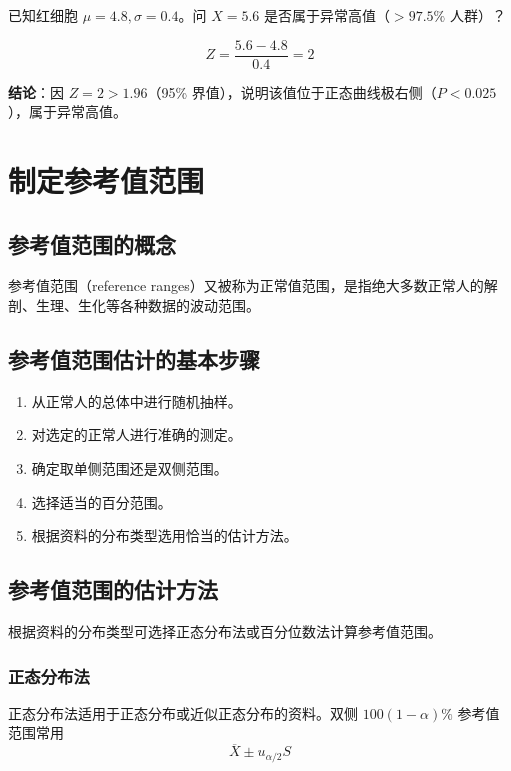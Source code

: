\documentclass[lang=cn,10pt]{elegantbook}
\begin{document}
\vspace{0.2cm}
\begin{exercise}
已知红细胞 $\mu=4.8, \sigma=0.4$。问 $X=5.6$ 是否属于异常高值（$>97.5\%$ 人群）？
\end{exercise}

\vspace{0.2cm}
\begin{solution}
\[ Z = \frac{5.6 - 4.8}{0.4} = 2 \]

\textbf{结论}：因 $Z=2 > 1.96$（95\% 界值），说明该值位于正态曲线极右侧（$P < 0.025$），属于异常高值。
\end{solution}

\chapter{制定参考值范围}
\section{参考值范围的概念}

参考值范围（reference ranges）又被称为正常值范围，是指绝大多数正常人的解剖、生理、生化等各种数据的波动范围。


\section{参考值范围估计的基本步骤}

\begin{enumerate}
\item 从正常人的总体中进行随机抽样。
\item 对选定的正常人进行准确的测定。
\item 确定取单侧范围还是双侧范围。
\item 选择适当的百分范围。
\item 根据资料的分布类型选用恰当的估计方法。
\end{enumerate}

\section{参考值范围的估计方法}

根据资料的分布类型可选择正态分布法或百分位数法计算参考值范围。

\subsection{正态分布法}

正态分布法适用于正态分布或近似正态分布的资料。双侧 $100(1-\alpha)\%$ 参考值范围常用
\begin{equation}
\overline{X}\pm u_{\alpha/2}S
\end{equation}
\end{document}

